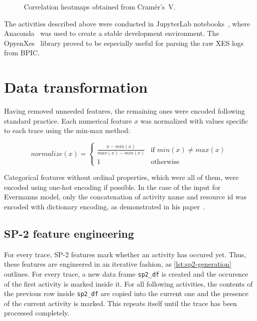 \begin{figure}
{    \label{fig:BPIC17-correlation-heatmap}
}
\caption{Correlation heatmaps obtained from Cramér's~V.}
\end{figure}

The activities described above were conducted in JupyterLab notebooks~\cite{web:jupyter}, where Anaconda~\cite{web:anaconda} was used to create a stable development environment. The OpyenXes~\cite{web:opyenxes} library proved to be especially useful for parsing the raw XES logs from BPIC.

\section{Data transformation}
\label{sec:eval:data-transformation}
Having removed unneeded features, the remaining ones were encoded following standard practice. Each numerical feature $x$ was normalized with values specific to each trace using the min-max method:

$$normalize(x) =
\begin{cases}
\frac{x-min(x)}{max(x)-min(x)} & \text{if } min(x) \neq max(x)\\
1 & \text{otherwise}
\end{cases}
$$

Categorical features without ordinal properties, which were all of them, were encoded using one-hot encoding if possible. In the case of the input for Evermanns model, only the concatenation of activity name and resource id was encoded with dictionary encoding, as demonstrated in his paper~\cite{evermann2016}.

\subsection*{SP-2 feature engineering}
For every trace, SP-2 features mark whether an activity has occured yet. Thus, these features are engineered in an iterative fashion, as \autoref{lst:sp2-generation} outlines. For every trace, a new data frame \texttt{sp2\_df} is created and the occurence of the first activity is marked inside it. For all following activities, the contents of the previous row inside \texttt{sp2\_df} are copied into the current one and the presence of the current activity is marked. This repeats itself until the trace has been processed completely.

